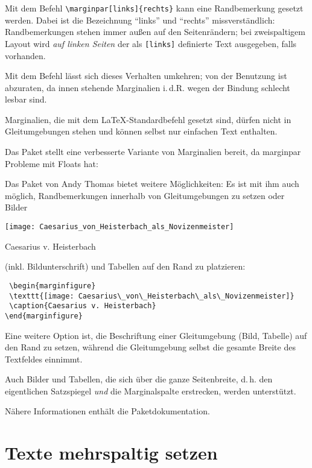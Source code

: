 Mit dem Befehl \lstinline/\marginpar[links]{rechts}/ kann eine Randbemerkung gesetzt werden.
Dabei ist die Bezeichnung \enquote{links} und \enquote{rechts} missverständlich: 
Randbemerkungen stehen immer außen auf den Seitenrändern; bei zweispaltigem Layout wird 
\emph{auf linken Seiten} der als \lstinline/[links]/ definierte Text ausgegeben, falls vorhanden.

Mit dem Befehl  lässt sich dieses Verhalten umkehren; 
von der Benutzung ist abzuraten, da innen stehende Marginalien i.\,d.R. wegen der Bindung schlecht
lesbar sind.

Marginalien, die mit dem \LaTeX -Standardbefehl gesetzt sind, dürfen nicht in Gleitumgebungen
stehen und können selbst nur einfachen Text enthalten.


Das Paket  stellt eine verbesserte Variante von Marginalien bereit, 
da marginpar Probleme mit Floats hat:

Das Paket  von Andy Thomas bietet weitere Möglichkeiten: 
Es ist mit ihm auch möglich, Randbemerkungen innerhalb von Gleitumgebungen zu setzen oder
Bilder
\begin{marginfigure}
 \texttt{[image: Caesarius\_von\_Heisterbach\_als\_Novizenmeister]}
 \caption{Caesarius v. Heisterbach}
\end{marginfigure}
(inkl. Bildunterschrift) und Tabellen auf den Rand zu platzieren:

\begin{lstlisting}
 \begin{marginfigure}
 \texttt{[image: Caesarius\_von\_Heisterbach\_als\_Novizenmeister]}
 \caption{Caesarius v. Heisterbach}
\end{marginfigure}
\end{lstlisting}


Eine weitere Option ist, die Beschriftung einer Gleitumgebung (Bild, Tabelle) auf den Rand zu
setzen, während die Gleitumgebung selbst die gesamte Breite des Textfeldes einnimmt.

Auch Bilder und Tabellen, die sich über die ganze Seitenbreite, d.\,h. den eigentlichen Satzspiegel
\emph{und} die Marginalspalte erstrecken, werden unterstützt.

Nähere Informationen enthält die Paketdokumentation.


\section{Texte mehrspaltig setzen}

